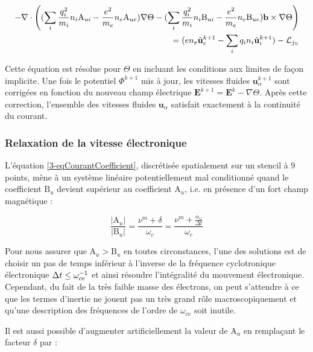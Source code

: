 \begin{refsection}
\begin{equation}
\begin{split}
\label{3-eqCourantCoefficient}
-\nabla\cdot\left((\sum_i\frac{q_i^2}{m_i}n_i\text{A}_{ui}-\frac{e^2}{m_e}n_e\text{A}_{ue})\nabla
\Theta-(\sum_i\frac{q_i^2}{m_i}n_i\text{B}_{ui}-\frac{e^2}{m_e}n_e\text{B}_{ue})\mathbf
b\times\nabla
\Theta\right)\\=(en_e\tilde{\mathbf
u}_e^{k+1}-\sum_iq_in_i\tilde{\mathbf u}_i^{k+1})-\mathcal L_{j_\para}
\end{split}
\end{equation}

Cette équation est résolue pour $\Theta$ en incluant les conditions aux limites
de façon implicite. Une fois le potentiel $\Phi^{k+1}$ mis à jour, les vitesses
fluides $\mathbf u^{k+1}_\alpha$ sont corrigées en fonction du nouveau champ
électrique $\mathbf{E}^{k+1}=\mathbf{E}^{k}-\nabla\Theta$.
Après cette correction, l'ensemble des vitesses fluides $\mathbf u_\alpha$
satisfait exactement à la continuité du courant.

\subsubsection{Relaxation de la vitesse électronique}

L'équation \eqref{3-eqCourantCoefficient}, discrétisée spatialement sur un
stencil à 9 points, mène à un système linéaire potentiellement mal conditionné
quand le coefficient $\text{B}_u$ devient supérieur au coefficient $\text{A}_u$,
i.e. en présence d'un fort champ magnétique :

\begin{equation}
\frac{|\text{A}_u|}{|\text{B}_u|}=\frac{\nu^m+\delta}{\omega_c}=\frac{\nu^m+\frac{\alpha_\omega}{\Delta
t}}{\omega_c}
\end{equation}

Pour nous assurer que $\text{A}_u>\text{B}_u$ en toutes circonstances, l'une
des solutions est de choisir un pas de temps inférieur à l'inverse de la
fréquence cyclotronique électronique $\Delta t\leq\omega_{ce}^{{-1}}$ et
ainsi résoudre l'intégralité du mouvement électronique. Cependant, du fait de
la très faible masse des électrons, on peut s'attendre à ce que les termes
d'inertie ne jouent pas un très grand rôle macroscopiquement et qu'une
description des fréquences de l'ordre de $\omega_{ce}$ soit inutile.

Il est aussi possible d'augmenter artificiellement la valeur de $\text{A}_u$ en
remplaçant le facteur $\delta$ par :


\end{refsection}
